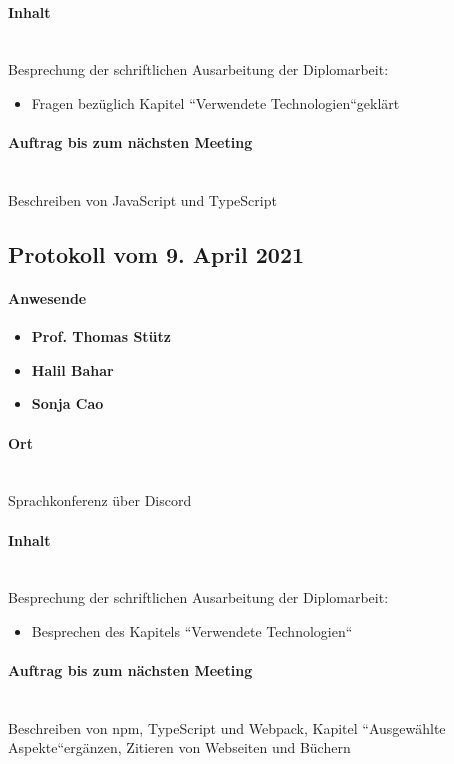 \paragraph{Inhalt}\mbox{}\\
Besprechung der schriftlichen Ausarbeitung der Diplomarbeit:
\begin{itemize}
	\item Fragen bezüglich Kapitel ``Verwendete Technologien``geklärt
\end{itemize}

\paragraph{Auftrag bis zum nächsten Meeting}\mbox{}\\
Beschreiben von JavaScript und TypeScript

\subsection{Protokoll vom 9. April 2021}

\paragraph{Anwesende}
\begin{itemize}
	\item{\textbf{Prof. Thomas Stütz}}
	\item{\textbf{Halil Bahar}}
	\item{\textbf{Sonja Cao}}
\end{itemize}

\paragraph{Ort}\mbox{}\\
Sprachkonferenz über Discord

\paragraph{Inhalt}\mbox{}\\
Besprechung der schriftlichen Ausarbeitung der Diplomarbeit:
\begin{itemize}
	\item Besprechen des Kapitels ``Verwendete Technologien``
\end{itemize}

\paragraph{Auftrag bis zum nächsten Meeting}\mbox{}\\
Beschreiben von npm, TypeScript und Webpack, Kapitel ``Ausgewählte Aspekte``ergänzen, Zitieren von Webseiten und Büchern